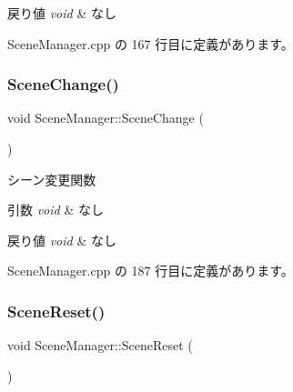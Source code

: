 \begin{DoxyRetVals}{戻り値}
{\em void} & なし \\
\hline
\end{DoxyRetVals}


 Scene\+Manager.\+cpp の 167 行目に定義があります。

\mbox{\label{class_scene_manager_ab1ffc5d84cf812e4105cba755d034770}} 
\subsubsection{\texorpdfstring{Scene\+Change()}{SceneChange()}}
{\footnotesize\ttfamily void Scene\+Manager\+::\+Scene\+Change (\begin{DoxyParamCaption}{ }\end{DoxyParamCaption})\hspace{0.3cm}{\ttfamily [private]}}



シーン変更関数 


\begin{DoxyParams}{引数}
{\em void} & なし \\
\hline
\end{DoxyParams}

\begin{DoxyRetVals}{戻り値}
{\em void} & なし \\
\hline
\end{DoxyRetVals}


 Scene\+Manager.\+cpp の 187 行目に定義があります。

\mbox{\label{class_scene_manager_a0652a81c7baff52add9ec4b13205865c}} 
\subsubsection{\texorpdfstring{Scene\+Reset()}{SceneReset()}}
{\footnotesize\ttfamily void Scene\+Manager\+::\+Scene\+Reset (\begin{DoxyParamCaption}{ }\end{DoxyParamCaption})\hspace{0.3cm}{\ttfamily [private]}}




